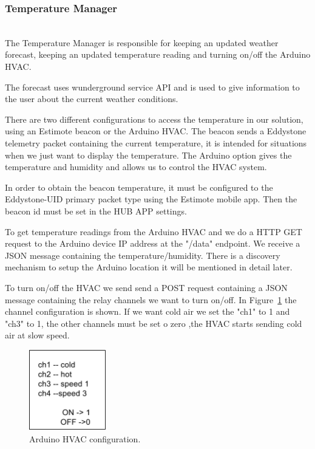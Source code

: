 \subsubsection{Temperature Manager}\label{temperature_manager_imp}\mbox{}\\


The Temperature Manager is responsible for keeping an updated weather forecast, keeping an updated temperature reading and turning on/off the Arduino \ac{HVAC}.

The forecast uses wunderground service API and is used to give information to the user about the current weather conditions.

There are two different configurations to access the temperature in our solution, using an Estimote beacon or the Arduino \ac{HVAC}. 
The beacon sends a Eddystone telemetry packet containing the current temperature, it is intended for situations when we just want to display the temperature.
The Arduino option gives the temperature and humidity and allows us to control the \ac{HVAC} system.


In order to obtain the beacon temperature, it must be configured to the Eddystone-UID primary packet type using the Estimote mobile app. Then the beacon id must be set in the HUB APP settings.

To get temperature readings from the Arduino \ac{HVAC} and we do a \ac{HTTP}  GET request to the Arduino device IP address at the "/data" endpoint. We receive a \ac{JSON} message containing the temperature/humidity. There is a discovery mechanism to setup the Arduino location it will be mentioned in detail later.

To turn on/off the \ac{HVAC} we send send a POST request containing a \ac{JSON} message containing the relay channels we want to turn on/off. In Figure~\ref{arduino_post_imp} the channel configuration is shown. If we want cold air we set the "ch1" to 1 and "ch3" to 1, the other channels must be set o zero ,the \ac{HVAC} starts sending cold air at slow speed.


\begin{figure}[h]
\centering
\includegraphics[width=0.3\textwidth]{Figures/temperature_post_imp}
\caption{Arduino HVAC configuration.}
\label{arduino_post_imp}
\end{figure}


